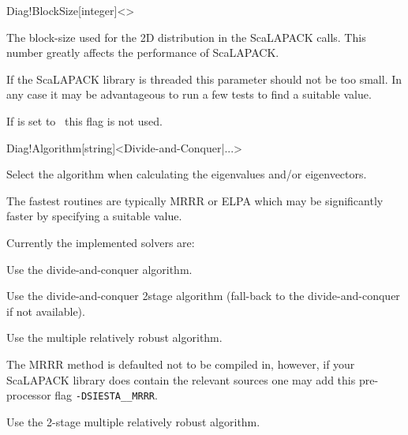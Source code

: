 \begin{fdfentry}{Diag!BlockSize}[integer]<>
  
  The block-size used for the 2D distribution in the ScaLAPACK calls.
  This number greatly affects the performance of ScaLAPACK.

  If the ScaLAPACK library is threaded this parameter should not be
  too small. In any case it may be advantageous to run a few tests to
  find a suitable value.

  \note If  is set to \fdffalse\ this flag is not
  used. 

\end{fdfentry}


\begin{fdfentry}{Diag!Algorithm}[string]<Divide-and-Conquer|...>

  Select the algorithm when calculating the eigenvalues and/or
  eigenvectors.

  The fastest routines are typically MRRR or ELPA which may be
  significantly faster by specifying a suitable
   value.

  Currently the implemented solvers are:

  \begin{fdfoptions}

    
    Use the divide-and-conquer algorithm.

    
    Use the divide-and-conquer 2stage algorithm (fall-back to the
    divide-and-conquer if not available).

    
    \option[MRRR]%
    
    Use the multiple relatively robust algorithm.
    
    \note The MRRR method is defaulted not to be compiled in, however,
    if your ScaLAPACK library does contain the relevant sources one
    may add this pre-processor flag \texttt{-DSIESTA\_\_MRRR}.

    
    Use the 2-stage multiple relatively robust algorithm.



\end{fdfoptions}
\end{fdfentry}
